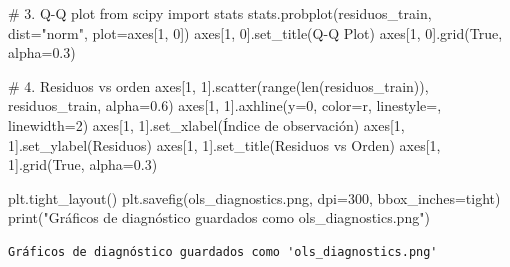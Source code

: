 \documentclass[
  doc,
  floatsintext,
  longtable,
  a4paper,
  nolmodern,
  notxfonts,
  notimes,
  12pt,
  colorlinks=true,linkcolor=blue,citecolor=blue,urlcolor=blue]{apa7}
\newenvironment{Shaded}{\begin{snugshade}}{\end{snugshade}}
\newcommand{\BuiltInTok}[1]{\textcolor[rgb]{0.00,0.23,0.31}{#1}}
\newcommand{\CommentTok}[1]{\textcolor[rgb]{0.37,0.37,0.37}{#1}}
\newcommand{\DecValTok}[1]{\textcolor[rgb]{0.68,0.00,0.00}{#1}}
\newcommand{\FloatTok}[1]{\textcolor[rgb]{0.68,0.00,0.00}{#1}}
\newcommand{\ImportTok}[1]{\textcolor[rgb]{0.00,0.46,0.62}{#1}}
\newcommand{\NormalTok}[1]{\textcolor[rgb]{0.00,0.23,0.31}{#1}}
\newcommand{\OperatorTok}[1]{\textcolor[rgb]{0.37,0.37,0.37}{#1}}
\newcommand{\StringTok}[1]{\textcolor[rgb]{0.13,0.47,0.30}{#1}}
\newcommand{\VariableTok}[1]{\textcolor[rgb]{0.07,0.07,0.07}{#1}}
\begin{document}
\begin{Shaded}
\begin{Highlighting}[]
\CommentTok{\# 3. Q{-}Q plot}
\ImportTok{from}\NormalTok{ scipy }\ImportTok{import}\NormalTok{ stats}
\NormalTok{stats.probplot(residuos\_train, dist}\OperatorTok{=}\StringTok{"norm"}\NormalTok{, plot}\OperatorTok{=}\NormalTok{axes[}\DecValTok{1}\NormalTok{, }\DecValTok{0}\NormalTok{])}
\NormalTok{axes[}\DecValTok{1}\NormalTok{, }\DecValTok{0}\NormalTok{].set\_title(}\StringTok{\textquotesingle{}Q{-}Q Plot\textquotesingle{}}\NormalTok{)}
\NormalTok{axes[}\DecValTok{1}\NormalTok{, }\DecValTok{0}\NormalTok{].grid(}\VariableTok{True}\NormalTok{, alpha}\OperatorTok{=}\FloatTok{0.3}\NormalTok{)}

\CommentTok{\# 4. Residuos vs orden}
\NormalTok{axes[}\DecValTok{1}\NormalTok{, }\DecValTok{1}\NormalTok{].scatter(}\BuiltInTok{range}\NormalTok{(}\BuiltInTok{len}\NormalTok{(residuos\_train)), residuos\_train, alpha}\OperatorTok{=}\FloatTok{0.6}\NormalTok{)}
\NormalTok{axes[}\DecValTok{1}\NormalTok{, }\DecValTok{1}\NormalTok{].axhline(y}\OperatorTok{=}\DecValTok{0}\NormalTok{, color}\OperatorTok{=}\StringTok{\textquotesingle{}r\textquotesingle{}}\NormalTok{, linestyle}\OperatorTok{=}\StringTok{\textquotesingle{}{-}{-}\textquotesingle{}}\NormalTok{, linewidth}\OperatorTok{=}\DecValTok{2}\NormalTok{)}
\NormalTok{axes[}\DecValTok{1}\NormalTok{, }\DecValTok{1}\NormalTok{].set\_xlabel(}\StringTok{\textquotesingle{}Índice de observación\textquotesingle{}}\NormalTok{)}
\NormalTok{axes[}\DecValTok{1}\NormalTok{, }\DecValTok{1}\NormalTok{].set\_ylabel(}\StringTok{\textquotesingle{}Residuos\textquotesingle{}}\NormalTok{)}
\NormalTok{axes[}\DecValTok{1}\NormalTok{, }\DecValTok{1}\NormalTok{].set\_title(}\StringTok{\textquotesingle{}Residuos vs Orden\textquotesingle{}}\NormalTok{)}
\NormalTok{axes[}\DecValTok{1}\NormalTok{, }\DecValTok{1}\NormalTok{].grid(}\VariableTok{True}\NormalTok{, alpha}\OperatorTok{=}\FloatTok{0.3}\NormalTok{)}

\NormalTok{plt.tight\_layout()}
\NormalTok{plt.savefig(}\StringTok{\textquotesingle{}ols\_diagnostics.png\textquotesingle{}}\NormalTok{, dpi}\OperatorTok{=}\DecValTok{300}\NormalTok{, bbox\_inches}\OperatorTok{=}\StringTok{\textquotesingle{}tight\textquotesingle{}}\NormalTok{)}
\BuiltInTok{print}\NormalTok{(}\StringTok{"Gráficos de diagnóstico guardados como \textquotesingle{}ols\_diagnostics.png\textquotesingle{}"}\NormalTok{)}
\end{Highlighting}
\end{Shaded}

\begin{verbatim}
Gráficos de diagnóstico guardados como 'ols_diagnostics.png'
\end{verbatim}
\end{document}
